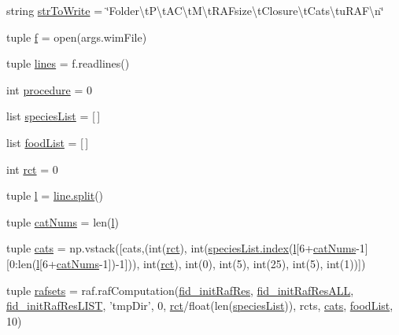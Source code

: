 \begin{DoxyCompactItemize}
\item 
string \hyperlink{a00094_a34b3667c3c217a35a0e9b71458d2b233}{str\-To\-Write} = \char`\"{}Folder\textbackslash{}t\-P\textbackslash{}t\-A\-C\textbackslash{}t\-M\textbackslash{}t\-R\-A\-Fsize\textbackslash{}t\-Closure\textbackslash{}t\-Cats\textbackslash{}tu\-R\-A\-F\textbackslash{}n\char`\"{}
\item 
tuple \hyperlink{a00094_ab599c65fad60b9c6ccc220002ce8f89c}{f} = open(args.\-wim\-File)
\item 
tuple \hyperlink{a00094_a2a83f40b2aa2cbcbd487195fef9af340}{lines} = f.\-readlines()
\item 
int \hyperlink{a00094_ac84174dad0b933ca88ebdb79cf3497ec}{procedure} = 0
\item 
list \hyperlink{a00094_aff8baae5d4cd1678204477dd5e620775}{species\-List} = \mbox{[}$\,$\mbox{]}
\item 
list \hyperlink{a00094_a878da371fd02e9515fe7305e0a57be09}{food\-List} = \mbox{[}$\,$\mbox{]}
\item 
int \hyperlink{a00094_a61159eb5aec77b97808ce3fb742d8f6d}{rct} = 0
\item 
tuple \hyperlink{a00094_a0437cd4d2a377ca0e34ab59f4bfd833f}{l} = \hyperlink{a00070_a4d1aa74fac80ae0275c056575fdb6626}{line.\-split}()
\item 
tuple \hyperlink{a00094_a0d474343423a1a87a760dd91411f96b4}{cat\-Nums} = len(\hyperlink{a00094_a0437cd4d2a377ca0e34ab59f4bfd833f}{l})
\item 
tuple \hyperlink{a00094_aea4d714ca7ceaba151380b3aed7c34d8}{cats} = np.\-vstack(\mbox{[}cats,(int(\hyperlink{a00094_a61159eb5aec77b97808ce3fb742d8f6d}{rct}), int(\hyperlink{a00054_a0cd6a44ffb07342cbc7e5ac33bfc9495}{species\-List.\-index}(\hyperlink{a00094_a0437cd4d2a377ca0e34ab59f4bfd833f}{l}\mbox{[}6+\hyperlink{a00094_a0d474343423a1a87a760dd91411f96b4}{cat\-Nums}-\/1\mbox{]}\mbox{[}0\-:len(\hyperlink{a00094_a0437cd4d2a377ca0e34ab59f4bfd833f}{l}\mbox{[}6+\hyperlink{a00094_a0d474343423a1a87a760dd91411f96b4}{cat\-Nums}-\/1\mbox{]})-\/1\mbox{]})), int(\hyperlink{a00094_a61159eb5aec77b97808ce3fb742d8f6d}{rct}), int(0), int(5), int(25), int(5), int(1))\mbox{]})
\item 
tuple \hyperlink{a00094_a36370edf2a6a4e19f0a99413aac43096}{rafsets} = raf.\-raf\-Computation(\hyperlink{a00094_a2f9cfe05abfed3ab6326d0cb094c7c80}{fid\-\_\-init\-Raf\-Res}, \hyperlink{a00094_add1c3bb75f1d98889c27099fc14fc6a8}{fid\-\_\-init\-Raf\-Res\-A\-L\-L}, \hyperlink{a00094_a7af2668de12720f3c7925527002d81b0}{fid\-\_\-init\-Raf\-Res\-L\-I\-S\-T}, 'tmp\-Dir', 0, \hyperlink{a00094_a61159eb5aec77b97808ce3fb742d8f6d}{rct}/float(len(\hyperlink{a00094_aff8baae5d4cd1678204477dd5e620775}{species\-List})), rcts, \hyperlink{a00094_aea4d714ca7ceaba151380b3aed7c34d8}{cats}, \hyperlink{a00094_a878da371fd02e9515fe7305e0a57be09}{food\-List}, 10)
\end{DoxyCompactItemize}


